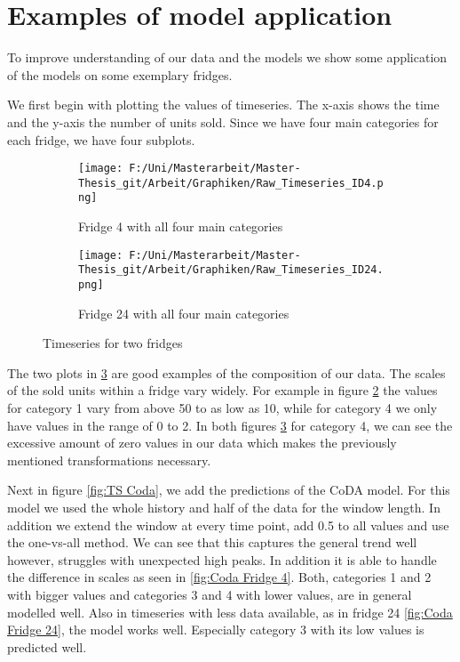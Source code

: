 \section{Examples of model application}
\label{sec:Examples of model applicatio}

To improve understanding of our data and the models we show some application of the models on some exemplary fridges. 

We first begin with plotting the values of timeseries. The x-axis shows the time and the y-axis the number of units sold. Since we have four main categories for each fridge, we have four subplots. 

\begin{figure}[htb]
\centering
\begin{subfigure}[b]{0.45\textwidth}
\texttt{[image: F:/Uni/Masterarbeit/Master-Thesis\_git/Arbeit/Graphiken/Raw\_Timeseries\_ID4.png]}
\caption{Fridge 4 with all four main categories}
\label{fig:TS Fridge 4}
\end{subfigure}
\hfill
\begin{subfigure}[b]{0.45\textwidth}
\texttt{[image: F:/Uni/Masterarbeit/Master-Thesis\_git/Arbeit/Graphiken/Raw\_Timeseries\_ID24.png]}
\caption{Fridge 24 with all four main categories}
\label{fig:TS Fridge 24}
\end{subfigure}
\caption{Timeseries for two fridges}
\label{fig:TS raw}
\end{figure}


The two plots in \ref{fig:TS raw} are good examples of the composition of our data. The scales of the sold units within a fridge vary widely. For example in figure \ref{fig:TS Fridge 24} the values for category 1 vary from above 50 to as low as 10, while for category 4 we only have values in the range of 0 to 2. In both figures \ref{fig:TS raw} for category 4, we can see the excessive amount of zero values in our data which makes the previously mentioned transformations necessary. 

Next in figure \ref{fig:TS Coda}, we add the predictions of the CoDA model. For this model we used the whole history and half of the data for the window length. In addition we extend the window at every time point, add 0.5 to all values and use the one-vs-all method. We can see that this captures the general trend well however, struggles with unexpected high peaks. In addition it is able to handle the difference in scales as seen in \ref{fig:Coda Fridge 4}. Both, categories 1 and 2 with bigger values and categories 3 and 4 with lower values, are in general modelled well. Also in timeseries with less data available, as in fridge 24 \ref{fig:Coda Fridge 24}, the model works well. Especially category 3 with its low values is predicted well. 

